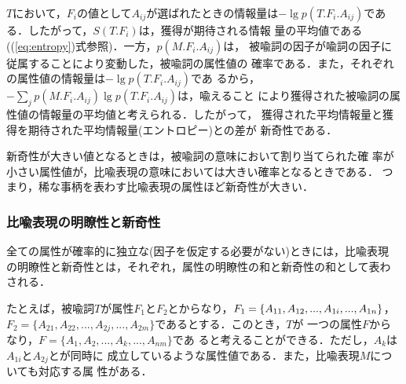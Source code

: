 $T$において，$F_i$の値として$A_{ij}$が選ばれたときの情報量は$-\lg
p(T.F_i.A_{ij})$である．したがって，$S(T.F_i)$は，獲得が期待される情報
量の平均値である((\ref{eq:entropy})式参照)．一方，$p(M.F_i.A_{ij})$は，
被\hspace{0.1mm}喩\hspace{0.1mm}詞\hspace{0.1mm}の因\hspace{0.1mm}子が喩\hspace{0.1mm}詞の因\hspace{0.1mm}子に従\hspace{0.1mm}属することにより変\hspace{0.1mm}動した，被\hspace{0.1mm}喩\hspace{0.1mm}詞の属\hspace{0.1mm}性\hspace{0.1mm}値の
確\hspace{0.1mm}率である．また，それぞれの属性値の情報量は$-\lg p(T.F_i.A_{ij})$であ
るから，$- \sum_{j} p(M.F_i.A_{ij}) \lg p(T.F_i.A_{ij})$は，喩えること
により獲得された被喩詞の属性値の情報量の平均値と考えられる．したがって，
獲得された平均情報量と獲得を期待された平均情報量(エントロピー)との差が
新奇性である．

新奇性が大きい値となるときは，被喩詞の意味において割り当てられた確
率が小さい属性値が，比喩表現の意味においては大きい確率となるときである．
つまり，稀な事柄を表わす比喩表現の属性ほど新奇性が大きい．

\subsubsection{比喩表現の明瞭性と新奇性}
全ての属性が確率的に独立な(因子を仮定する必要がない)ときには，比喩表現
の明瞭性と新奇性とは，それぞれ，属性の明瞭性の和と新奇性の和として表わ
される．

たとえば，被喩詞$T$\hspace{-0.1mm}が属性$F_1$\hspace{-0.1mm}と\hspace{-0.1mm}$F_2$\hspace{-0.1mm}とからなり，\hspace{-0.1mm}$F_1 \hspace{-0.1mm}=\hspace{-0.1mm}
\{A_{11},A_{12},...,A_{1i},...,A_{1n}\}$，$F_2 =
\{A_{21},A_{22},...,A_{2j},...,A_{2m}\}$であるとする．このとき，$T$が
一つの属性$F$からなり，$F = \{A_{1},A_{2},...,A_{k},...,A_{nm}\}$であ
ると考えることができる．\hspace{-0.1mm}ただし，$A_{k}$は$A_{1i}$と\hspace{-0.1mm}$A_{2j}$とが同時に
成立しているような属性値である．また，比喩表現$M$についても対応する属
性がある．

